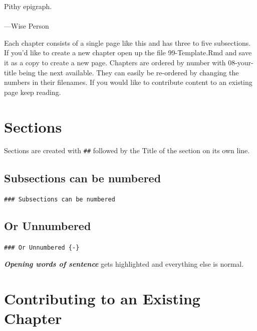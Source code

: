 \documentclass[
  12pt, openany]{book}
\newenvironment{epigraph}%
{
\begin{flushright}
\begin{minipage}{30em}
\begin{flushright}
\itshape
}%
{
\end{flushright}
\end{minipage}
\end{flushright}
\vspace{1em}
}
\begin{document}
\begin{epigraph}

Pithy epigraph.\\
~\\
---Wise Person

\end{epigraph}

\begin{center}

\begin{argument}

Each chapter consists of a single page like this and has three to five subsections. If you'd like to create a new chapter open up the file 99-Template.Rmd and save it as a copy to create a new page. Chapters are ordered by number with 08-your-title being the next available. They can easily be re-ordered by changing the numbers in their filenames. If you would like to contribute content to an existing page keep reading.

\end{argument}

\end{center}

\hypertarget{sections}{%
\section{Sections}\label{sections}}

Sections are created with \texttt{\#\#} followed by the Title of the section on its own line.

\hypertarget{subsections-can-be-numbered}{%
\subsection{Subsections can be numbered}\label{subsections-can-be-numbered}}

\texttt{\#\#\#\ Subsections\ can\ be\ numbered}

\hypertarget{or-unnumbered}{%
\subsection*{Or Unnumbered}\label{or-unnumbered}}


\texttt{\#\#\#\ Or\ Unnumbered\ \{-\}}

\textbf{\emph{Opening words of sentence}} gets highlighted and everything else is normal.

\hypertarget{contributing-to-an-existing-chapter}{%
\section{Contributing to an Existing Chapter}\label{contributing-to-an-existing-chapter}}
\end{document}
